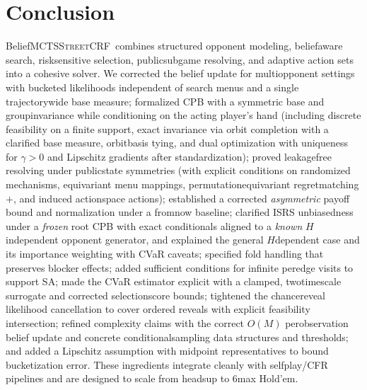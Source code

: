 \documentclass[10pt]{article}
\newcommand{\sCRF}{\textsc{Street\textendash CRF}\xspace}
\newcommand{\1}{\mathbf{1}}
\theoremstyle{plain}
\begin{document}
\section{Conclusion}
Belief\textendash MCTS\textendash \sCRF\ combines structured opponent modeling, belief\textendash aware search, risk\textendash sensitive selection, public\textendash subgame re\textendash solving, and adaptive action sets into a cohesive solver. We corrected the belief update for multi\textendash opponent settings with bucketed likelihoods independent of search menus and a single trajectory\textendash wide base measure; formalized CPB with a symmetric base and group\textendash invariance while conditioning on the acting player's hand (including discrete feasibility on a finite support, exact invariance via orbit completion with a clarified base measure, orbit\textendash basis tying, and dual optimization with uniqueness for $\gamma>0$ and Lipschitz gradients after standardization); proved leakage\textendash free re\textendash solving under public\textendash state symmetries (with explicit conditions on randomized mechanisms, equivariant menu mappings, permutation\textendash equivariant regret\textendash matching$+$, and induced action\textendash space actions); established a corrected \emph{asymmetric} payoff bound and normalization under a from\textendash now baseline; clarified IS\textendash RS unbiasedness under a \emph{frozen} root CPB with exact conditionals aligned to a \emph{known} $H$\textendash independent opponent generator, and explained the general $H$\textendash dependent case and its importance weighting with CVaR caveats; specified fold handling that preserves blocker effects; added sufficient conditions for infinite per\textendash edge visits to support SA; made the CVaR estimator explicit with a clamped, two\textendash timescale surrogate and corrected selection\textendash score bounds; tightened the chance\textendash reveal likelihood cancellation to cover ordered reveals with explicit feasibility intersection; refined complexity claims with the correct $O(M)$ per\textendash observation belief update and concrete conditional\textendash sampling data structures and thresholds; and added a Lipschitz assumption with midpoint representatives to bound bucketization error. These ingredients integrate cleanly with self\textendash play/CFR pipelines and are designed to scale from heads\textendash up to 6\textendash max Hold'em.
\end{document}
